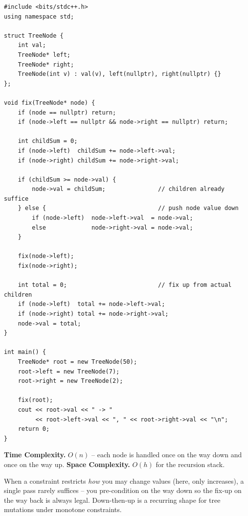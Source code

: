 \begin{lstlisting}
#include <bits/stdc++.h>
using namespace std;

struct TreeNode {
    int val;
    TreeNode* left;
    TreeNode* right;
    TreeNode(int v) : val(v), left(nullptr), right(nullptr) {}
};

void fix(TreeNode* node) {
    if (node == nullptr) return;
    if (node->left == nullptr && node->right == nullptr) return;

    int childSum = 0;
    if (node->left)  childSum += node->left->val;
    if (node->right) childSum += node->right->val;

    if (childSum >= node->val) {
        node->val = childSum;               // children already suffice
    } else {                                // push node value down
        if (node->left)  node->left->val  = node->val;
        else             node->right->val = node->val;
    }

    fix(node->left);
    fix(node->right);

    int total = 0;                          // fix up from actual children
    if (node->left)  total += node->left->val;
    if (node->right) total += node->right->val;
    node->val = total;
}

int main() {
    TreeNode* root = new TreeNode(50);
    root->left = new TreeNode(7);
    root->right = new TreeNode(2);

    fix(root);
    cout << root->val << " -> "
         << root->left->val << ", " << root->right->val << "\n";
    return 0;
}
\end{lstlisting}

\begin{complexitybox}
\textbf{Time Complexity.} $O(n)$ -- each node is handled once on the way
down and once on the way up. \textbf{Space Complexity.} $O(h)$ for the
recursion stack.
\end{complexitybox}

\begin{takeawaybox}
When a constraint restricts \emph{how} you may change values (here, only
increases), a single pass rarely suffices -- you pre-condition on the way
down so the fix-up on the way back is always legal. Down-then-up is a
recurring shape for tree mutations under monotone constraints.
\end{takeawaybox}
